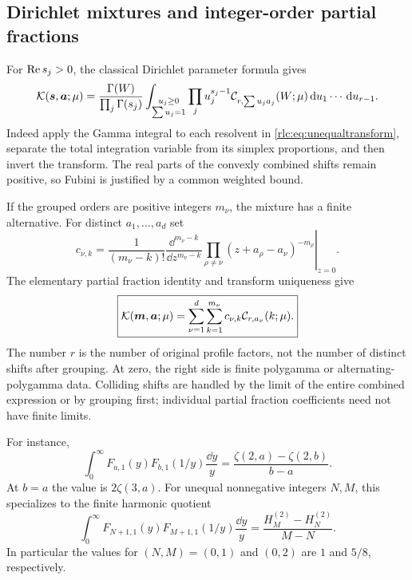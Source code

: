 \subsection{Dirichlet mixtures and integer-order partial fractions}
For $\operatorname{Re} s_j>0$, the classical Dirichlet parameter formula gives
\begin{equation}\label{rlc:eq:simplex}
 \mathcal K(\boldsymbol s,\boldsymbol a;\mu)
 =\frac{\Gamma(W)}{\prod_j\Gamma(s_j)}
 \int_{\substack{u_j\ge0\\\sum u_j=1}}
       \prod_j u_j^{s_j-1}
       \mathcal C_{r,\sum u_ja_j}(W;\mu)\,\mathrm d u_1\cdots\,\mathrm d u_{r-1}.
\end{equation}
Indeed apply the Gamma integral to each resolvent in
\eqref{rlc:eq:unequaltransform}, separate the total integration variable
from its simplex proportions, and then invert the transform. The real
parts of the convexly combined shifts remain positive, so Fubini is
justified by a common weighted bound.

If the grouped orders are positive integers $m_\nu$, the mixture has a
finite alternative. For distinct $a_1,\ldots,a_d$ set
\begin{equation}\label{rlc:eq:partialcoeff}
 c_{\nu,k}=\frac1{(m_\nu-k)!}
 \left.\frac{\dd^{m_\nu-k}}{\dd z^{m_\nu-k}}
 \prod_{\rho\ne\nu}(z+a_\rho-a_\nu)^{-m_\rho}\right|_{z=0}.
\end{equation}
The elementary partial fraction identity and transform uniqueness give
\begin{equation}\label{rlc:eq:partialclosure}
 \boxed{\displaystyle
 \mathcal K(\boldsymbol m,\boldsymbol a;\mu)
       =\sum_{\nu=1}^{d}\sum_{k=1}^{m_\nu}
             c_{\nu,k}\mathcal C_{r,a_\nu}(k;\mu).}
\end{equation}
The number $r$ is the number of original profile factors, not the number
of distinct shifts after grouping. At zero, the right side is finite
polygamma or alternating-polygamma data. Colliding shifts are handled
by the limit of the entire combined expression or by grouping first;
individual partial fraction coefficients need not have finite limits.

For instance,
\begin{equation}\label{rlc:eq:unequal11}
 \int_0^\infty F_{a,1}(y)F_{b,1}(1/y)\frac{\dd y}{y}
       =\frac{\zeta(2,a)-\zeta(2,b)}{b-a}.
\end{equation}
At $b=a$ the value is $2\zeta(3,a)$. For unequal nonnegative integers
$N,M$, this specializes to the finite harmonic quotient
\begin{equation}\label{rlc:eq:unequalharmonic}
 \int_0^\infty F_{N+1,1}(y)F_{M+1,1}(1/y)\frac{\dd y}{y}
       =\frac{H_M^{(2)}-H_N^{(2)}}{M-N}.
\end{equation}
In particular the values for $(N,M)=(0,1)$ and $(0,2)$ are $1$ and
$5/8$, respectively.


